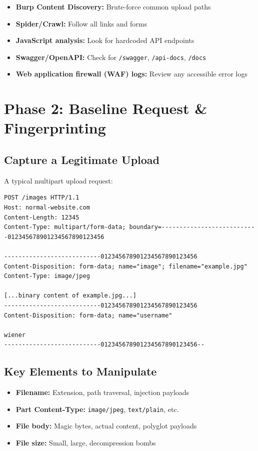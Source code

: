 \documentclass[11pt]{article}
\begin{document}
\begin{itemize}
    \item \textbf{Burp Content Discovery:} Brute-force common upload paths
    \item \textbf{Spider/Crawl:} Follow all links and forms
    \item \textbf{JavaScript analysis:} Look for hardcoded API endpoints
    \item \textbf{Swagger/OpenAPI:} Check for \texttt{/swagger}, \texttt{/api-docs}, \texttt{/docs}
    \item \textbf{Web application firewall (WAF) logs:} Review any accessible error logs
\end{itemize}

\section{Phase 2: Baseline Request \& Fingerprinting}

\subsection{Capture a Legitimate Upload}

A typical multipart upload request:

\begin{lstlisting}[language=http]
POST /images HTTP/1.1
Host: normal-website.com
Content-Length: 12345
Content-Type: multipart/form-data; boundary=---------------------------012345678901234567890123456

---------------------------012345678901234567890123456
Content-Disposition: form-data; name="image"; filename="example.jpg"
Content-Type: image/jpeg

[...binary content of example.jpg...]
---------------------------012345678901234567890123456
Content-Disposition: form-data; name="username"

wiener
---------------------------012345678901234567890123456--
\end{lstlisting}

\subsection{Key Elements to Manipulate}

\begin{checklistbox}
\begin{itemize}
    \item[\checkmark] \textbf{Filename:} Extension, path traversal, injection payloads
    \item[\checkmark] \textbf{Part Content-Type:} \texttt{image/jpeg}, \texttt{text/plain}, etc.
    \item[\checkmark] \textbf{File body:} Magic bytes, actual content, polyglot payloads
    \item[\checkmark] \textbf{File size:} Small, large, decompression bombs
\end{itemize}
\end{checklistbox}
\end{document}
